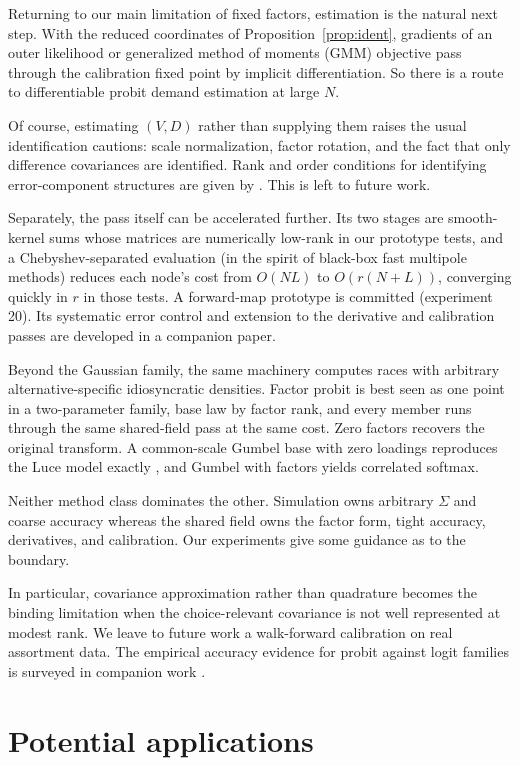 \documentclass[12pt]{article}
\theoremstyle{remark}
\begin{document}
Returning to our main limitation of fixed factors, estimation is the natural next step. With the reduced coordinates of
Proposition~\ref{prop:ident}, gradients of an outer likelihood or generalized method of moments
(GMM) objective pass through the calibration fixed point by implicit
differentiation. So there is a route to differentiable probit demand estimation at large
$N$. 

Of course, estimating $(V, D)$ rather than supplying them raises the usual
identification cautions: scale normalization, factor rotation, and the fact
that only difference covariances are identified. Rank and order
conditions for identifying error-component structures are given by
\citet{walker2007}. This is left to future work. 

Separately, the pass itself can be accelerated further. Its two stages
are smooth-kernel sums whose matrices are numerically low-rank in our
prototype tests, and a
Chebyshev-separated evaluation (in the spirit of black-box fast multipole methods) reduces
each node's cost from $O(NL)$ to $O(r(N+L))$, converging quickly in
$r$ in those tests. A forward-map prototype is committed (experiment 20). Its systematic
error control and extension to the derivative and calibration passes are
developed in a companion paper.

Beyond the Gaussian family, the same machinery computes races with arbitrary
alternative-specific idiosyncratic densities. Factor probit is best
seen as one point in a two-parameter family, base law by factor rank,
and every member runs through the same shared-field pass at the same
cost. Zero factors recovers the original transform. A common-scale
Gumbel base with zero loadings reproduces the Luce model exactly
\citep{luce1959,yellott1977}, and Gumbel with factors yields
correlated softmax.

Neither method class dominates the other. Simulation owns arbitrary
$\Sigma$ and coarse accuracy whereas the shared field owns the factor form,
tight accuracy, derivatives, and calibration. Our experiments give some guidance as to the boundary. 

In particular, covariance approximation rather than quadrature
becomes the binding limitation when the choice-relevant covariance is
not well represented at modest rank. We leave to future work a
walk-forward calibration on real assortment data. The empirical
accuracy evidence for probit against logit families is surveyed in
companion work \citep{cottonsurvey}.

\section{Potential applications}\label{sec:applications}
\end{document}
